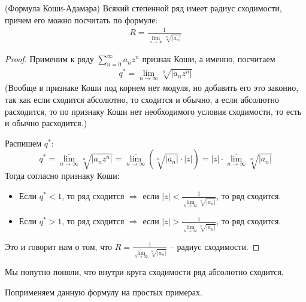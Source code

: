 \begin{theorem} (Формула Коши-Адамара)
    Всякий степенной ряд имеет радиус сходимости, причем его можно посчитать по формуле:
    \begin{gather*}
        R = \frac{1}{\overline{\lim\limits_{n \to \infty}} \sqrt[n]{|a_n|}}
    \end{gather*}
\end{theorem}
\begin{proof}
    Применим к ряду $\sum\limits_{n = 0}^\infty a_n z^n$ признак Коши, а именно, посчитаем 
    \begin{gather*}
        q^* = \overline{\lim\limits_{n \to \infty}} \sqrt[n]{|a_nz^n|}
    \end{gather*}
    (Вообще в признаке Коши под корнем нет модуля, но добавить его это законно, так как если сходится абсолютно, то сходится и обычно, а если абсолютно расходится, то по признаку Коши нет необходимого условия сходимости, то есть и обычно расходится.)

    Распишем $q^*:$ \[ q^* = \overline{\lim_{n \to \infty}} \sqrt[n]{|a_nz^n|} = \overline{\lim_{n \to \infty}} (\sqrt[n]{|a_n|} \cdot |z|) = |z| \cdot \overline{\lim_{n \to \infty}} \sqrt[n]{|a_n|}   \]
    Тогда согласно признаку Коши: \begin{itemize}
        \item Если $q^* < 1$, то ряд сходится $\Rightarrow$ если $|z| < \frac{1}{\overline{\lim\limits_{n \to \infty}} \sqrt[n]{|a_n|}}$, то ряд сходится.
        \item Если $q^* > 1$, то ряд сходится $\Rightarrow$ если $|z| > \frac{1}{\overline{\lim\limits_{n \to \infty}} \sqrt[n]{|a_n|}}$, то ряд сходится.
    \end{itemize}
    Это и говорит нам о том, что $R = \frac{1}{\overline{\lim\limits_{n \to \infty}} \sqrt[n]{|a_n|}}$ -- радиус сходимости.
\end{proof}

\begin{notice}
    Мы попутно поняли, что внутри круга сходимости ряд абсолютно сходится.
\end{notice}

\vspace*{7mm}
Поприменяем данную формулу на простых примерах.

